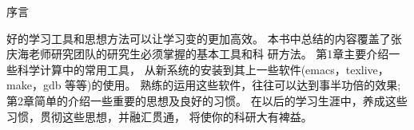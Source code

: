 
\begin{center}
  \large
  序言
\end{center}

好的学习工具和思想方法可以让学习变的更加高效。
本书中总结的内容覆盖了张庆海老师研究团队的研究生必须掌握的基本工具和科
研方法。
第1章主要介绍一些科学计算中的常用工具，
从新系统的安装到其上一些软件(emacs，texlive，make，gdb 等等)的使用。
熟练的运用这些软件，往往可以达到事半功倍的效果;
第2章简单的介绍一些重要的思想及良好的习惯。
在以后的学习生涯中，养成这些习惯，贯彻这些思想，并融汇贯通，
将使你的科研大有裨益。


